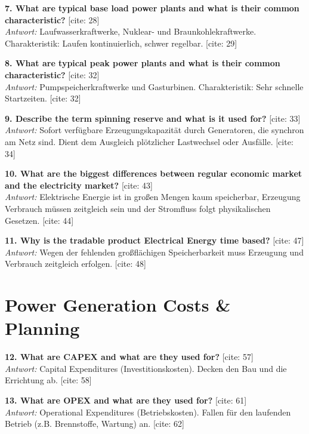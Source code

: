 \documentclass[11pt,a4paper]{article}
\begin{document}
\vspace{0.5cm}
\textbf{7. What are typical base load power plants and what is their common characteristic?} [cite: 28]\\
\textit{Antwort:} Laufwasserkraftwerke, Nuklear- und Braunkohlekraftwerke. Charakteristik: Laufen kontinuierlich, schwer regelbar. [cite: 29]

\vspace{0.5cm}
\textbf{8. What are typical peak power plants and what is their common characteristic?} [cite: 32]\\
\textit{Antwort:} Pumpspeicherkraftwerke und Gasturbinen. Charakteristik: Sehr schnelle Startzeiten. [cite: 32]

\vspace{0.5cm}
\textbf{9. Describe the term spinning reserve and what is it used for?} [cite: 33]\\
\textit{Antwort:} Sofort verfügbare Erzeugungskapazität durch Generatoren, die synchron am Netz sind. Dient dem Ausgleich plötzlicher Lastwechsel oder Ausfälle. [cite: 34]

\vspace{0.5cm}
\textbf{10. What are the biggest differences between regular economic market and the electricity market?} [cite: 43]\\
\textit{Antwort:} Elektrische Energie ist in großen Mengen kaum speicherbar, Erzeugung Verbrauch müssen zeitgleich sein und der Stromfluss folgt physikalischen Gesetzen. [cite: 44]

\vspace{0.5cm}
\textbf{11. Why is the tradable product Electrical Energy time based?} [cite: 47]\\
\textit{Antwort:} Wegen der fehlenden großflächigen Speicherbarkeit muss Erzeugung und Verbrauch zeitgleich erfolgen. [cite: 48]

\section*{Power Generation Costs \& Planning}

\textbf{12. What are CAPEX and what are they used for?} [cite: 57]\\
\textit{Antwort:} Capital Expenditures (Investitionskosten). Decken den Bau und die Errichtung ab. [cite: 58]

\vspace{0.5cm}
\textbf{13. What are OPEX and what are they used for?} [cite: 61]\\
\textit{Antwort:} Operational Expenditures (Betriebskosten). Fallen für den laufenden Betrieb (z.B. Brennstoffe, Wartung) an. [cite: 62]
\end{document}
